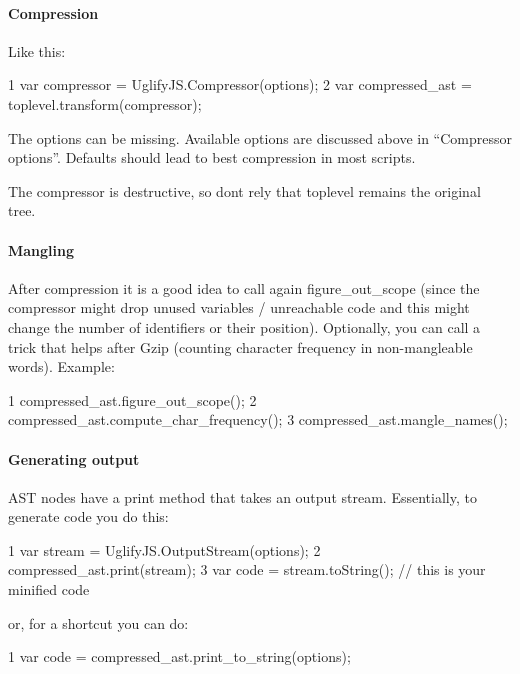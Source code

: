 \paragraph*{Compression}

Like this\+: 
\begin{DoxyCode}
1 var compressor = UglifyJS.Compressor(options);
2 var compressed\_ast = toplevel.transform(compressor);
\end{DoxyCode}


The {\ttfamily options} can be missing. Available options are discussed above in “\+Compressor options”. Defaults should lead to best compression in most scripts.

The compressor is destructive, so don\textquotesingle{}t rely that {\ttfamily toplevel} remains the original tree.

\paragraph*{Mangling}

After compression it is a good idea to call again {\ttfamily figure\+\_\+out\+\_\+scope} (since the compressor might drop unused variables / unreachable code and this might change the number of identifiers or their position). Optionally, you can call a trick that helps after Gzip (counting character frequency in non-\/mangleable words). Example\+: 
\begin{DoxyCode}
1 compressed\_ast.figure\_out\_scope();
2 compressed\_ast.compute\_char\_frequency();
3 compressed\_ast.mangle\_names();
\end{DoxyCode}


\paragraph*{Generating output}

A\+S\+T nodes have a {\ttfamily print} method that takes an output stream. Essentially, to generate code you do this\+: 
\begin{DoxyCode}
1 var stream = UglifyJS.OutputStream(options);
2 compressed\_ast.print(stream);
3 var code = stream.toString(); // this is your minified code
\end{DoxyCode}


or, for a shortcut you can do\+: 
\begin{DoxyCode}
1 var code = compressed\_ast.print\_to\_string(options);
\end{DoxyCode}



